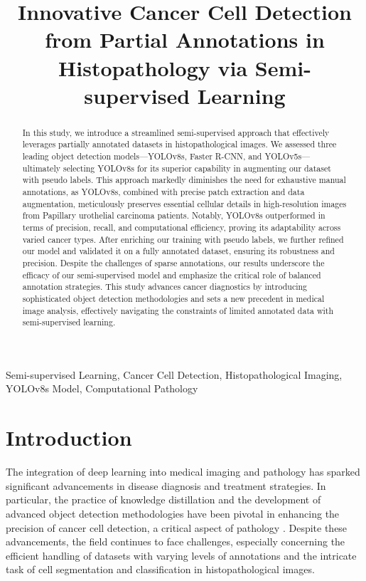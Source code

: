 \documentclass[anon]{midl} %
\title[Innovative Cancer Cell Detection]{Innovative Cancer Cell Detection from Partial Annotations in Histopathology via Semi-supervised Learning}
\begin{document}
\maketitle

\begin{abstract}
In this study, we introduce a streamlined semi-supervised approach that effectively leverages partially annotated datasets in histopathological images. We assessed three leading object detection models—YOLOv8s, Faster R-CNN, and YOLOv5s—ultimately selecting YOLOv8s for its superior capability in augmenting our dataset with pseudo labels. This approach markedly diminishes the need for exhaustive manual annotations, as YOLOv8s, combined with precise patch extraction and data augmentation, meticulously preserves essential cellular details in high-resolution images from Papillary urothelial carcinoma patients. Notably, YOLOv8s outperformed in terms of precision, recall, and computational efficiency, proving its adaptability across varied cancer types. After enriching our training with pseudo labels, we further refined our model and validated it on a fully annotated dataset, ensuring its robustness and precision. Despite the challenges of sparse annotations, our results underscore the efficacy of our semi-supervised model and emphasize the critical role of balanced annotation strategies. This study advances cancer diagnostics by introducing sophisticated object detection methodologies and sets a new precedent in medical image analysis, effectively navigating the constraints of limited annotated data with semi-supervised learning.
\end{abstract}

\begin{keywords}
Semi-supervised Learning, Cancer Cell Detection, Histopathological Imaging, YOLOv8s Model, Computational Pathology
\end{keywords}



\section{Introduction}

The integration of deep learning into medical imaging and pathology has sparked significant advancements in disease diagnosis and treatment strategies. In particular, the practice of knowledge distillation and the development of advanced object detection methodologies have been pivotal in enhancing the precision of cancer cell detection, a critical aspect of pathology \cite{Hinton:arXiv:2015:Distilling, Smith2018, Johnson2020}. Despite these advancements, the field continues to face challenges, especially concerning the efficient handling of datasets with varying levels of annotations and the intricate task of cell segmentation and classification in histopathological images.
\end{document}
